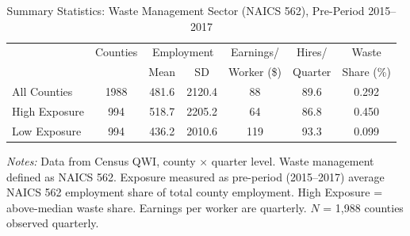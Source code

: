 \begin{table}[t]
\centering
\caption{Summary Statistics: Waste Management Sector (NAICS 562), Pre-Period 2015--2017}
\label{tab:summary}
\begin{threeparttable}
\small
\begin{tabular}{lcccccc}
\hline\hline
 & Counties & \multicolumn{2}{c}{Employment} & Earnings/ & Hires/ & Waste \\
 & & Mean & SD & Worker (\$) & Quarter & Share (\%) \\
\hline
All Counties & 1988 & 481.6 & 2120.4 & 88 & 89.6 & 0.292 \\
\hline
High Exposure & 994 & 518.7 & 2205.2 & 64 & 86.8 & 0.450 \\
Low Exposure & 994 & 436.2 & 2010.6 & 119 & 93.3 & 0.099 \\
\hline\hline
\end{tabular}
\begin{tablenotes}
\item \textit{Notes:} Data from Census QWI, county $\times$ quarter level. Waste management defined as NAICS 562. Exposure measured as pre-period (2015--2017) average NAICS 562 employment share of total county employment. High Exposure = above-median waste share. Earnings per worker are quarterly. $N$ = 1,988 counties observed quarterly.
\end{tablenotes}
\end{threeparttable}
\end{table}

